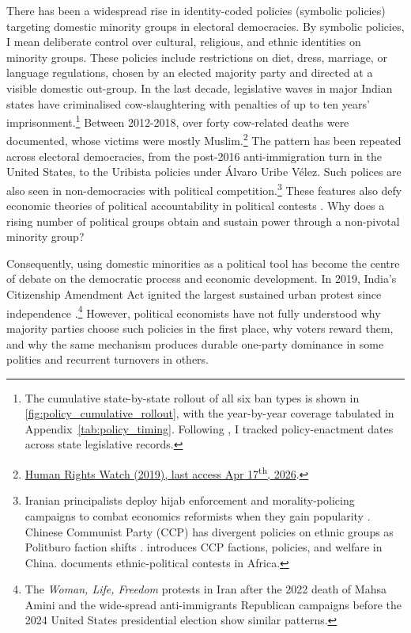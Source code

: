 \documentclass[11pt,twoside]{extarticle}
\begin{document}
There has been a widespread rise in identity-coded policies (symbolic policies) targeting domestic minority groups in electoral democracies. By symbolic policies, I mean deliberate control over cultural, religious, and ethnic identities on minority groups. These policies include restrictions on diet, dress, marriage, or language regulations, chosen by an elected majority party and directed at a visible domestic out-group. In the last decade, legislative waves in major Indian states have criminalised cow-slaughtering with penalties of up to ten years' imprisonment.\footnote{The cumulative state-by-state rollout of all six ban types is shown in \autoref{fig:policy_cumulative_rollout}, with the year-by-year coverage tabulated in Appendix~\autoref{tab:policy_timing}. Following \citet*{dasguptaNutritionalCostBeef2023}, I tracked policy-enactment dates across state legislative records.} Between 2012-2018, over forty cow-related deaths were documented, whose victims were mostly Muslim.\footnote{\href{https://www.hrw.org/report/2019/02/19/violent-cow-protection-india/vigilante-groups-attack-minorities}{Human Rights Watch (2019), last access Apr 17\textsuperscript{th}, 2026}.} The pattern has been repeated across electoral democracies, from the post-2016 anti-immigration turn in the United States, to the Uribista policies under Álvaro Uribe Vélez. Such polices are also seen in non-democracies with political competition.\footnote{Iranian principalists deploy hijab enforcement and morality-policing campaigns to combat economics reformists when they gain popularity \citep*{bajoghliIranReframedAnxieties2020}. Chinese Communist Party (CCP) has divergent policies on ethnic groups as Politburo faction shifts \citep*{leiboldEthnicPolicyChina2013}. \citet*{francoisFactionsNondemocraciesTheory2023} introduces CCP factions, policies, and welfare in China. \citet*{francoisHowPowerShared2015} documents ethnic-political contests in Africa.} These features also defy economic theories of political accountability in political contests \citep*{barroControlPoliticiansEconomic1973,ferejohnIncumbentPerformanceElectoral1986}. Why does a rising number of political groups obtain and sustain power through a non-pivotal minority group?


Consequently, using domestic minorities as a political tool has become the centre of debate on the democratic process and economic development. In 2019, India's Citizenship Amendment Act ignited the largest sustained urban protest since independence \citep{jaffrelotModisIndiaHindu2021}.\footnote{The \emph{Woman, Life, Freedom} protests in Iran after the 2022 death of Mahsa Amini and the wide-spread anti-immigrants Republican campaigns before the 2024 United States presidential election show similar patterns.} However, political economists have not fully understood why majority parties choose such policies in the first place, why voters reward them, and why the same mechanism produces durable one-party dominance in some polities and recurrent turnovers in others.
\end{document}
